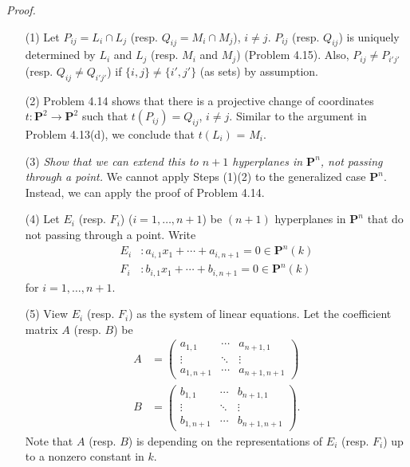 \documentclass{article}
\begin{document}
\emph{Proof.}
\begin{enumerate}
\item[(1)]
  Let $P_{ij} = L_i \cap L_j$ (resp. $Q_{ij} = M_i \cap M_j$), $i \neq j$.
  $P_{ij}$ (resp. $Q_{ij}$) is uniquely determined by
  $L_i$ and $L_j$ (resp. $M_i$ and $M_j$) (Problem 4.15).
  Also, $P_{ij} \neq P_{i'j'}$ (resp. $Q_{ij} \neq Q_{i'j'}$)
  if $\{ i,j \} \neq \{ i',j' \}$ (as sets) by assumption.

\item[(2)]
  Problem 4.14 shows that
  there is a projective change of coordinates $t: \mathbf{P}^{2} \to \mathbf{P}^{2}$
  such that $t(P_{ij}) = Q_{ij}$, $i \neq j$.
  Similar to the argument in Problem 4.13(d), we conclude that $t(L_i)$ = $M_i$.

\item[(3)]
  \emph{Show that we can extend this to $n+1$ hyperplanes in $\mathbf{P}^{n}$,
  not passing through a point.}
  We cannot apply Steps (1)(2) to the generalized case $\mathbf{P}^{n}$.
  Instead, we can apply the proof of Problem 4.14.

\item[(4)]
  Let $E_i$ (resp. $F_i$) ($i=1,\ldots,n+1$) be $(n+1)$ hyperplanes in $\mathbf{P}^{n}$
  that do not passing through a point.
  Write
  \begin{align*}
    E_i &: a_{i,1} x_1 + \cdots + a_{i,n+1} = 0 \in \mathbf{P}^n(k) \\
    F_i &: b_{i,1} x_1 + \cdots + b_{i,n+1} = 0 \in \mathbf{P}^n(k)
  \end{align*}
  for $i = 1, \ldots, n+1$.

\item[(5)]
  View $E_i$ (resp. $F_i$) as the system of linear equations.
  Let the coefficient matrix $A$ (resp. $B$) be
    \begin{align*}
    A
    &=
    \begin{pmatrix}
      a_{1,1}   & \cdots & a_{n+1,1} \\
      \vdots    & \ddots & \vdots \\
      a_{1,n+1} & \cdots & a_{n+1,n+1}
    \end{pmatrix} \\
    B
    &=
    \begin{pmatrix}
      b_{1,1}   & \cdots & b_{n+1,1} \\
      \vdots    & \ddots & \vdots \\
      b_{1,n+1} & \cdots & b_{n+1,n+1}
    \end{pmatrix}.
  \end{align*}
  Note that
  $A$ (resp. $B$) is depending on the representations of $E_i$ (resp. $F_i$)
  up to a nonzero constant in $k$.


\end{enumerate}
\end{document}
